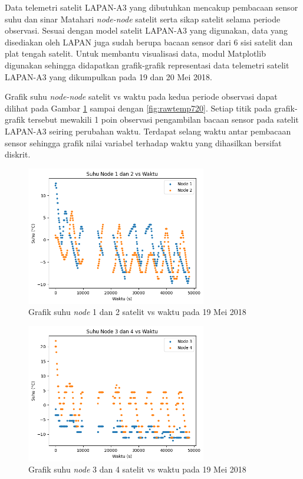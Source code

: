 Data telemetri satelit LAPAN-A3 yang dibutuhkan mencakup pembacaan sensor suhu
dan sinar Matahari \textit{node-node} satelit serta sikap satelit selama
periode observasi. Sesuai dengan model satelit LAPAN-A3 yang digunakan, data
yang disediakan oleh LAPAN juga sudah berupa bacaan sensor dari 6 sisi satelit
dan plat tengah satelit. Untuk membantu visualisasi data, modul Matplotlib
digunakan sehingga didapatkan grafik-grafik representasi data telemetri satelit
LAPAN-A3 yang dikumpulkan pada 19 dan 20 Mei 2018.

Grafik suhu \textit{node-node} satelit vs waktu pada kedua periode observasi
dapat dilihat pada Gambar \ref{fig:rawtemp1219} sampai dengan
\ref{fig:rawtemp720}. Setiap titik pada grafik-grafik tersebut mewakili 1 poin
observasi pengambilan bacaan sensor pada satelit LAPAN-A3 seiring perubahan
waktu. Terdapat selang waktu antar pembacaan sensor sehingga grafik nilai
variabel terhadap waktu yang dihasilkan bersifat diskrit.

\begin{figure}[H]
\setlength{}
\begin{center}
\includegraphics[width=0.7\textwidth]{fig/raw_node12_temp_2018-05-19.png}
	\caption{Grafik suhu \textit{node} 1 dan 2 satelit vs waktu pada 19 Mei 2018}
\label{fig:rawtemp1219}
\end{center}
\end{figure}

\begin{figure}[H]
\setlength{}
\begin{center}
\includegraphics[width=0.7\textwidth]{fig/raw_node34_temp_2018-05-19.png}
	\caption{Grafik suhu \textit{node} 3 dan 4 satelit vs waktu pada 19 Mei 2018}
\label{fig:rawtemp3419}
\end{center}
\end{figure}

